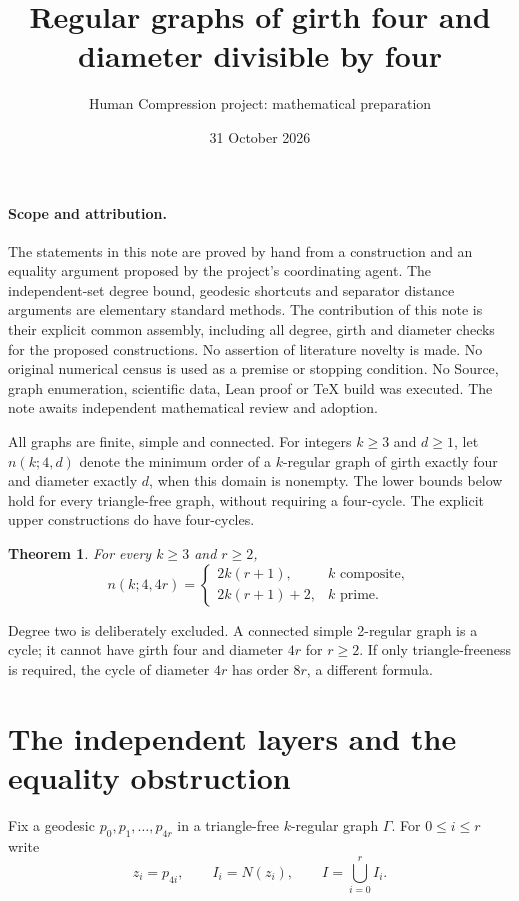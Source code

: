 \documentclass[11pt]{article}
\title{Regular graphs of girth four and diameter divisible by four}
\author{Human Compression project: mathematical preparation}
\date{31 October 2026}
\newtheorem{theorem}{Theorem}[section]
\begin{document}
\maketitle

\paragraph{Scope and attribution.}
The statements in this note are proved by hand from a construction and
an equality argument proposed by the project's coordinating agent.
The independent-set degree bound, geodesic shortcuts and separator
distance arguments are elementary standard methods. The contribution
of this note is their explicit common assembly, including all degree,
girth and diameter checks for the proposed constructions. No assertion
of literature novelty is made. No original numerical census is used
as a premise or stopping condition. No Source, graph enumeration,
scientific data, Lean proof or TeX build was executed. The note awaits
independent mathematical review and adoption.

All graphs are finite, simple and connected. For integers $k\geq3$ and
$d\geq1$, let $n(k;4,d)$ denote the minimum order of a $k$-regular graph
of girth exactly four and diameter exactly $d$, when this domain is
nonempty. The lower bounds below hold for every triangle-free graph,
without requiring a four-cycle. The explicit upper constructions do
have four-cycles.

\begin{theorem}\label{main}
For every $k\geq3$ and $r\geq2$,
\[
 n(k;4,4r)=
 \begin{cases}
 2k(r+1),&k\text{ composite},\\
 2k(r+1)+2,&k\text{ prime}.
 \end{cases}
\]
\end{theorem}

Degree two is deliberately excluded. A connected simple 2-regular
graph is a cycle; it cannot have girth four and diameter $4r$ for
$r\geq2$. If only triangle-freeness is required, the cycle of diameter
$4r$ has order $8r$, a different formula.

\section{The independent layers and the equality obstruction}

Fix a geodesic $p_0,p_1,\ldots,p_{4r}$ in a triangle-free $k$-regular
graph $\Gamma$. For $0\leq i\leq r$ write
\[
 z_i=p_{4i},\qquad I_i=N(z_i),\qquad I=\bigcup_{i=0}^r I_i.
\]
\end{document}

